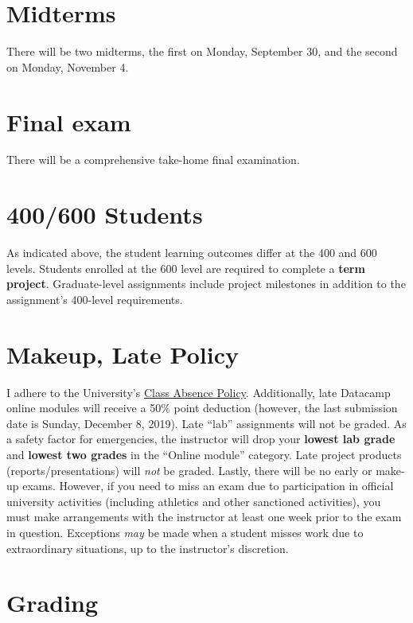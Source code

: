 \documentclass[11pt,onecolumn]{article}
\begin{document}
\section*{Midterms}
There will be two midterms, the first on Monday, September 30, and the second on Monday, November 4.

\section*{Final exam}
There will be a comprehensive take-home final examination.

\section*{400/600 Students}
As indicated above, the student learning outcomes differ at the 400 and 600 levels. Students enrolled at the 600 level are required to complete a \textbf{term project}. Graduate-level assignments include project milestones in addition to the assignment's 400-level requirements.

\section*{Makeup, Late Policy}
I adhere to the University's \href{https://www.unr.edu/administrative-manual/3000-3999-students/3020-class-absence-policy}{Class Absence Policy}. Additionally, late Datacamp online modules will receive a 50\% point deduction (however, the last submission date is Sunday, December 8, 2019). Late ``lab'' assignments will not be graded. As a safety factor for emergencies, the instructor will drop your \textbf{lowest lab grade} and \textbf{lowest two grades} in the ``Online module'' category. Late project products (reports/presentations) will \textit{not} be graded. Lastly, there will be no early or make-up exams. However, if you need to miss an exam due to participation in official university activities (including athletics and other sanctioned activities), you must make arrangements with the instructor at least one week prior to the exam in question. Exceptions \textit{may} be made when a student misses work due to extraordinary situations, up to the instructor's discretion.

\newpage
\section*{Grading}
\end{document}
